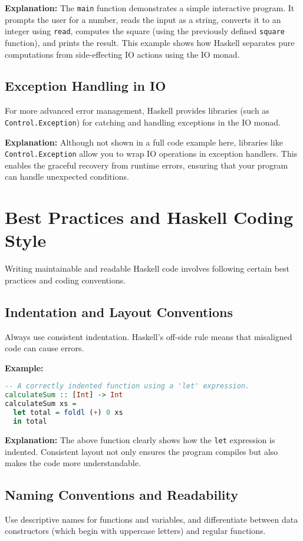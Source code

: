 \documentclass[11pt,a4paper]{article}
\begin{document}
\textbf{Explanation:}  
The \texttt{main} function demonstrates a simple interactive program. It prompts the user for a number, reads the input as a string, converts it to an integer using \texttt{read}, computes the square (using the previously defined \texttt{square} function), and prints the result. This example shows how Haskell separates pure computations from side-effecting IO actions using the IO monad.

\subsection{Exception Handling in IO}
For more advanced error management, Haskell provides libraries (such as \texttt{Control.Exception}) for catching and handling exceptions in the IO monad.

\textbf{Explanation:}  
Although not shown in a full code example here, libraries like \texttt{Control.Exception} allow you to wrap IO operations in exception handlers. This enables the graceful recovery from runtime errors, ensuring that your program can handle unexpected conditions.

\section{Best Practices and Haskell Coding Style}
Writing maintainable and readable Haskell code involves following certain best practices and coding conventions.

\subsection{Indentation and Layout Conventions}
Always use consistent indentation. Haskell’s off-side rule means that misaligned code can cause errors.

\textbf{Example:}
\begin{lstlisting}[language=Haskell]
-- A correctly indented function using a 'let' expression.
calculateSum :: [Int] -> Int
calculateSum xs =
  let total = foldl (+) 0 xs
  in total
\end{lstlisting}

\textbf{Explanation:}  
The above function clearly shows how the \texttt{let} expression is indented. Consistent layout not only ensures the program compiles but also makes the code more understandable.

\subsection{Naming Conventions and Readability}
Use descriptive names for functions and variables, and differentiate between data constructors (which begin with uppercase letters) and regular functions.
\end{document}
